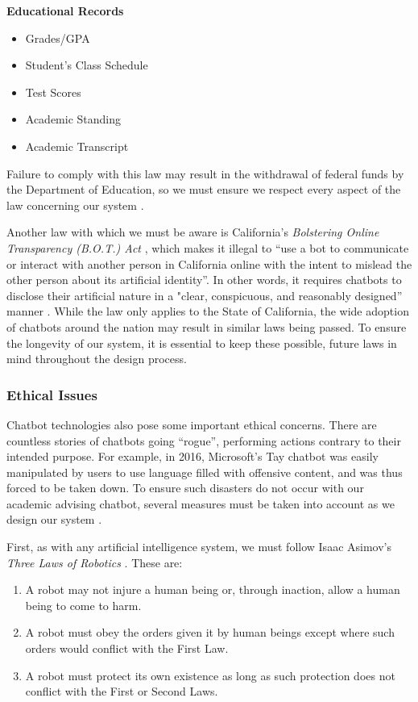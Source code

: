 \documentclass[titlepage, 12pt]{article}
\begin{document}
\textbf{Educational Records}
\begin{itemize}
    \item Grades/GPA
    \item Student’s Class Schedule
    \item Test Scores
    \item Academic Standing
    \item Academic Transcript
\end{itemize}

Failure to comply with this law may result in the withdrawal of federal funds by the Department of Education, so we must ensure we respect every aspect of the law concerning our system \cite{bib-1-3}.

Another law with which we must be aware is California’s \emph{Bolstering Online Transparency (B.O.T.) Act} \cite{bib-1-4}, which makes it illegal to “use a bot to communicate or interact with another person in California online with the intent to mislead the other person about its artificial identity”. In other words, it requires chatbots to disclose their artificial nature in a "clear, conspicuous, and reasonably designed” manner \cite{bib-1-4}. While the law only applies to the State of California, the wide adoption of chatbots around the nation may result in similar laws being passed. To ensure the longevity of our system, it is essential to keep these possible, future laws in mind throughout the design process.

\subsubsection{Ethical Issues}

Chatbot technologies also pose some important ethical concerns. There are countless stories of chatbots going “rogue”, performing actions contrary to their intended purpose. For example, in 2016, Microsoft’s Tay chatbot was easily manipulated by users to use language filled with offensive content, and was thus forced to be taken down. To ensure such disasters do not occur with our academic advising chatbot, several measures must be taken into account as we design our system \cite{bib-1-5}.

First, as with any artificial intelligence system, we must follow Isaac Asimov’s \emph{Three Laws of Robotics} \cite{bib-1-6}. These are:

\begin{enumerate}
    \item A robot may not injure a human being or, through inaction, allow a human being to come to harm.
    \item A robot must obey the orders given it by human beings except where such orders would conflict with the First Law.
    \item A robot must protect its own existence as long as such protection does not conflict with the First or Second Laws.
\end{enumerate}
\end{document}
